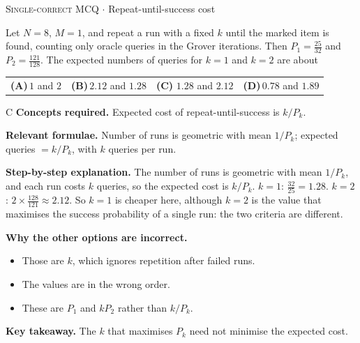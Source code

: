 \documentclass[11pt,a4paper]{article}
\newcommand{\optlabel}[1]{\textbf{(#1)}}
\newcommand{\correctlabel}[1]{\textcolor{okgreen}{\textbf{(#1)}\,\ding{51}}}
\newenvironment{qitem}[1]{\begin{list}{}{\setlength{\leftmargin}{3.3em}\setlength{\labelwidth}{3.1em}%
  \setlength{\labelsep}{0.2em}\setlength{\topsep}{3pt}\setlength{\parsep}{3pt}}\item[\textbf{Q.#1}\hfill]}{\end{list}}
\newcommand{\qsep}{\par\vspace{2pt}{\color{black!15}\hrule}\vspace{4pt}}
\newcommand{\qmeta}[2]{{\footnotesize\color{black!60}\textsc{#1} \;$\cdot$\; #2}\par}
\begin{document}
\begin{qitem}{74}
\qmeta{Single-correct MCQ}{Repeat-until-success cost}
Let $N = 8$, $M = 1$, and repeat a run with a fixed $k$ until the marked item is found, counting only oracle queries in the Grover iterations. Then $P_1 = \frac{25}{32}$ and $P_2 = \frac{121}{128}$. The expected numbers of queries for $k = 1$ and $k = 2$ are about
\par\smallskip\noindent\begin{tabularx}{\linewidth}{@{}*{4}{L}@{}}
\optlabel{A}\,$1$ and $2$ & \optlabel{B}\,$2.12$ and $1.28$ & \correctlabel{C}\,$1.28$ and $2.12$ & \optlabel{D}\,$0.78$ and $1.89$
\end{tabularx}
\end{qitem}
\begin{solbox}{C}
\textbf{\color{brand}Concepts required.} Expected cost of repeat-until-success is $k/P_k$.

\textbf{\color{brand}Relevant formulae.} Number of runs is geometric with mean $1/P_k$; expected queries $= k/P_k$, with $k$ queries per run.

\textbf{\color{brand}Step-by-step explanation.} The number of runs is geometric with mean $1/P_k$, and each run costs $k$ queries, so the expected cost is $k/P_k$. $k = 1$: $\frac{32}{25} = 1.28$. $k = 2$: $2\times\frac{128}{121} \approx 2.12$. So $k = 1$ is cheaper here,
although $k = 2$ is the value that maximises the success probability of a single run: the two criteria are different.

\textbf{\color{brand}Why the other options are incorrect.}
\begin{itemize}[leftmargin=2.4em, itemsep=1pt, topsep=2pt]
\item[\textbf{(A)}] Those are $k$, which ignores repetition after failed runs.
\item[\textbf{(B)}] The values are in the wrong order.
\item[\textbf{(D)}] These are $P_1$ and $k P_2$ rather than $k/P_k$.
\end{itemize}
\textbf{\color{brand}Key takeaway.} The $k$ that maximises $P_k$ need not minimise the expected cost.
\end{solbox}
\qsep
\end{document}
